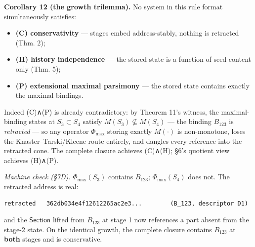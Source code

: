 \documentclass[
  10pt,
]{article}
\providecommand{\tightlist}{%
  \setlength{\itemsep}{0pt}\setlength{\parskip}{0pt}}
\begin{document}
\textbf{Corollary 12 (the growth trilemma).} No system in this rule
format simultaneously satisfies:

\begin{itemize}
\tightlist
\item
  \textbf{(C) conservativity} --- stages embed address-stably, nothing
  is retracted (Thm. 2);
\item
  \textbf{(H) history independence} --- the stored state is a function
  of seed content only (Thm. 5);
\item
  \textbf{(P) extensional maximal parsimony} --- the stored state
  contains exactly the maximal bindings.
\end{itemize}

Indeed (C)∧(P) is already contradictory: by Theorem 11's witness, the
maximal-binding states at \(S_3 \subset S_4\) satisfy
\(M(S_3) \not\subseteq M(S_4)\) --- the binding \(B_{123}\) is
\emph{retracted} --- so any operator \(\Phi_{\max}\) storing exactly
\(M(\cdot)\) is non-monotone, loses the Knaster--Tarski/Kleene route
entirely, and dangles every reference into the retracted cone. The
complete closure achieves (C)∧(H); §6's quotient view achieves (H)∧(P).

\emph{Machine check (§7D).} \(\Phi_{\max}(S_3)\) contains \(B_{123}\);
\(\Phi_{\max}(S_4)\) does not. The retracted address is real:

\begin{verbatim}
retracted   362db034e4f12612265ac2e3...        (B_123, descriptor D1)
\end{verbatim}

and the \(\mathsf{Section}\) lifted from \(B_{123}\) at stage 1 now
references a part absent from the stage-2 state. On the identical
growth, the complete closure contains \(B_{123}\) at \textbf{both}
stages and is conservative.
\end{document}
